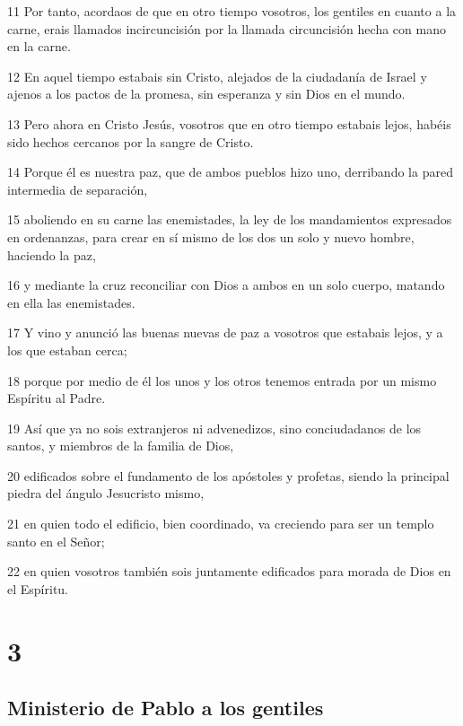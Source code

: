 \par 11 Por tanto, acordaos de que en otro tiempo vosotros, los gentiles en cuanto a la carne, erais llamados incircuncisión por la llamada circuncisión hecha con mano en la carne.
\par 12 En aquel tiempo estabais sin Cristo, alejados de la ciudadanía de Israel y ajenos a los pactos de la promesa, sin esperanza y sin Dios en el mundo.
\par 13 Pero ahora en Cristo Jesús, vosotros que en otro tiempo estabais lejos, habéis sido hechos cercanos por la sangre de Cristo.
\par 14 Porque él es nuestra paz, que de ambos pueblos hizo uno, derribando la pared intermedia de separación,
\par 15 aboliendo en su carne las enemistades, la ley de los mandamientos expresados en ordenanzas, para crear en sí mismo de los dos un solo y nuevo hombre, haciendo la paz,
\par 16 y mediante la cruz reconciliar con Dios a ambos en un solo cuerpo, matando en ella las enemistades.
\par 17 Y vino y anunció las buenas nuevas de paz a vosotros que estabais lejos, y a los que estaban cerca;
\par 18 porque por medio de él los unos y los otros tenemos entrada por un mismo Espíritu al Padre.
\par 19 Así que ya no sois extranjeros ni advenedizos, sino conciudadanos de los santos, y miembros de la familia de Dios,
\par 20 edificados sobre el fundamento de los apóstoles y profetas, siendo la principal piedra del ángulo Jesucristo mismo,
\par 21 en quien todo el edificio, bien coordinado, va creciendo para ser un templo santo en el Señor;
\par 22 en quien vosotros también sois juntamente edificados para morada de Dios en el Espíritu.

\chapter{3}

\section*{Ministerio de Pablo a los gentiles}

